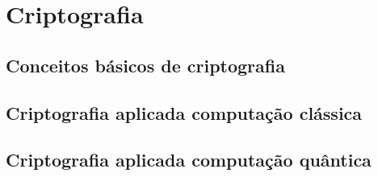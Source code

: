 \section{Criptografia}
\subsection{Conceitos básicos de criptografia}
\subsection{Criptografia aplicada computação clássica}
\subsection{Criptografia aplicada computação quântica}